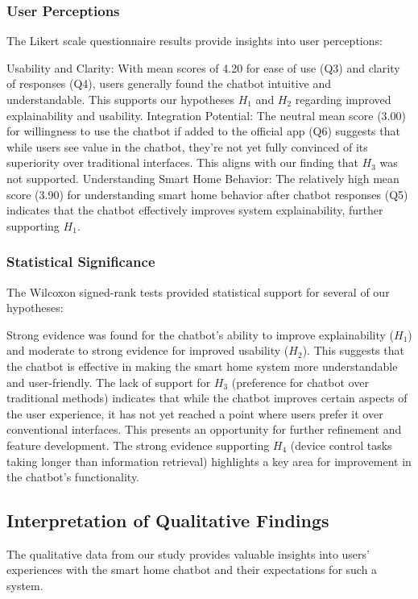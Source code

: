 \subsubsection{User Perceptions}
The Likert scale questionnaire results provide insights into user perceptions:

Usability and Clarity: With mean scores of 4.20 for ease of use (Q3) and clarity of responses (Q4), users generally found the chatbot intuitive and understandable. This supports our hypotheses \(H_1\) and \(H_2\) regarding improved explainability and usability.
Integration Potential: The neutral mean score (3.00) for willingness to use the chatbot if added to the official app (Q6) suggests that while users see value in the chatbot, they're not yet fully convinced of its superiority over traditional interfaces. This aligns with our finding that \(H_3\) was not supported.
Understanding Smart Home Behavior: The relatively high mean score (3.90) for understanding smart home behavior after chatbot responses (Q5) indicates that the chatbot effectively improves system explainability, further supporting \(H_1\).

\subsubsection{Statistical Significance}
The Wilcoxon signed-rank tests provided statistical support for several of our hypotheses:

Strong evidence was found for the chatbot's ability to improve explainability (\(H_1\)) and moderate to strong evidence for improved usability (\(H_2\)). This suggests that the chatbot is effective in making the smart home system more understandable and user-friendly.
The lack of support for \(H_3\) (preference for chatbot over traditional methods) indicates that while the chatbot improves certain aspects of the user experience, it has not yet reached a point where users prefer it over conventional interfaces. This presents an opportunity for further refinement and feature development.
The strong evidence supporting \(H_4\) (device control tasks taking longer than information retrieval) highlights a key area for improvement in the chatbot's functionality.

\subsection{Interpretation of Qualitative Findings}
The qualitative data from our study provides valuable insights into users' experiences with the smart home chatbot and their expectations for such a system.
